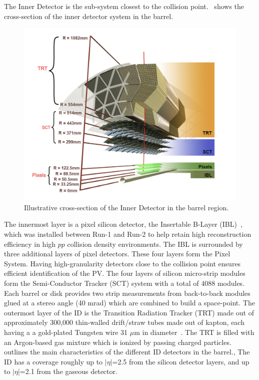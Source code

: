 The Inner Detector is the sub-system closest to the collision point.~ shows the cross-section of the inner detector system in the barrel. 

\begin{figure}[!ht]
    \centering
    \includegraphics[width=0.8\linewidth]{figures/experiment/InnerDetector.png}
    \caption{Illustrative cross-section of the Inner Detector in the barrel region.~\cite{atlascollaboration2023software}}
    \label{fig:inner-det}
\end{figure}

The innermost layer is a pixel silicon detector, the Insertable B-Layer (IBL)~\cite{Capeans:1291633}, which was installed between Run-1 and Run-2 to help retain high reconstruction efficiency in high $pp$ collision density environments. The IBL is surrounded by three additional layers of pixel detectors. These four layers form the Pixel System. Having high-granularity detectors close to the collision point ensures efficient identification of the PV. The four layers of silicon micro-strip modules form the Semi-Conductor Tracker (SCT) system with a total of 4088 modules. Each barrel or disk provides two strip measurements from back-to-back modules glued at a stereo angle (40 mrad) which are combined to build a space-point. The outermost layer of the ID is the Transition Radiation Tracker (TRT) made out of approximately 300,000 thin-walled drift/straw tubes made out of kapton, each having a a gold-plated Tungsten wire 31 $\mu$m in diameter~\cite{CERN-LHCC-97-016}. The TRT is filled with an Argon-based gas mixture which is ionized by passing charged particles.  outlines the main characteristics of the different ID detectors in the barrel., The ID has a coverage roughly up to $|\eta|$=2.5 from the silicon detector layers, and up to $|\eta|$=2.1 from the gaseous detector.

